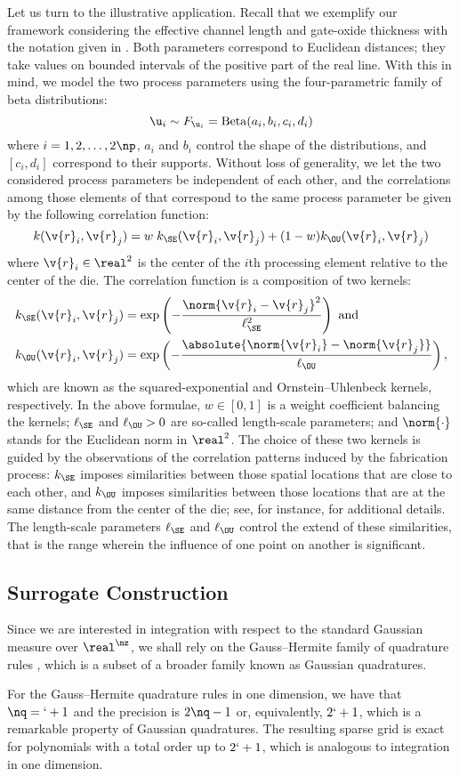 Let us turn to the illustrative application. Recall that we exemplify our
framework considering the effective channel length and gate-oxide thickness with
the notation given in . Both parameters
correspond to Euclidean distances; they take values on bounded intervals of the
positive part of the real line. With this in mind, we model the two process
parameters using the four-parametric family of beta distributions:
\[
  \u_i \sim F_{\u_i} = \mathrm{Beta}(a_i, b_i, c_i, d_i)
\]
where $i = 1, 2, \dots, 2 \np$, $a_i$ and $b_i$ control the shape of the
distributions, and $[c_i, d_i]$ correspond to their supports. Without loss of
generality, we let the two considered process parameters be independent of each
other, and the correlations among those elements of \vu that correspond to the
same process parameter be given by the following correlation function:
\[
  k(\v{r}_i, \v{r}_j) = w \; k_\SE(\v{r}_i, \v{r}_j) + (1 - w) k_\OU(\v{r}_i, \v{r}_j)
\]
where $\v{r}_i \in \real^2$ is the center of the $i$th processing element
relative to the center of the die. The correlation function is a composition of
two kernels:
\begin{align*}
  & k_\SE(\v{r}_i, \v{r}_j) = \exp\left(- \frac{\norm{\v{r}_i - \v{r}_j}^2}{\ell_\SE^2} \right) \text{ and} \\
  & k_\OU(\v{r}_i, \v{r}_j) = \exp\left(- \frac{\absolute{\norm{\v{r}_i} - \norm{\v{r}_j}}}{\ell_\OU} \right),
\end{align*}
which are known as the squared-exponential and Ornstein--Uhlenbeck kernels,
respectively. In the above formulae, $w \in [0, 1]$ is a weight coefficient
balancing the kernels; $\ell_\SE$ and $\ell_\OU > 0$ are so-called length-scale
parameters; and $\norm{\cdot}$ stands for the Euclidean norm in $\real^2$. The
choice of these two kernels is guided by the observations of the correlation
patterns induced by the fabrication process: $k_\SE$ imposes similarities
between those spatial locations that are close to each other, and $k_\OU$
imposes similarities between those locations that are at the same distance from
the center of the die; see, for instance, \cite{friedberg2005} for additional
details. The length-scale parameters $\ell_\SE$ and $\ell_\OU$ control the
extend of these similarities, that is the range wherein the influence of one
point on another is significant.

\subsection{Surrogate Construction}

Since we are interested in integration with respect to the standard Gaussian
measure over $\real^\nz$, we shall rely on the Gauss--Hermite family of
quadrature rules \cite{maitre2010}, which is a subset of a broader family known
as Gaussian quadratures.

For the Gauss--Hermite quadrature rules in one dimension, we have that $\nq =
\lq + 1$ and the precision is $2 \nq - 1$ \cite{heiss2008} or, equivalently, $2
\lq + 1$, which is a remarkable property of Gaussian quadratures. The resulting
sparse grid is exact for polynomials with a total order up to $2 \lq + 1$, which
is analogous to integration in one dimension.
